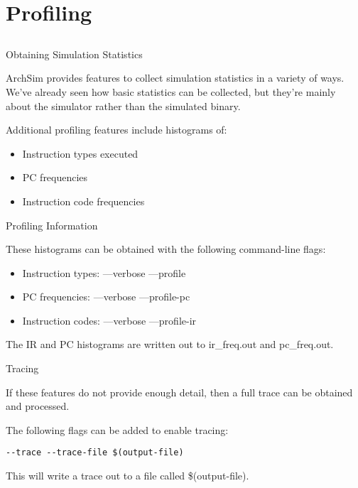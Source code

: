 \section{Profiling}
\subsection{}

\begin{frame}{Obtaining Simulation Statistics}

ArchSim provides features to collect simulation statistics in a variety
of ways. We've already seen how basic statistics can be collected, but
they're mainly about the simulator rather than the simulated binary.

Additional profiling features include histograms of:
\begin{itemize}
\item Instruction types executed
\item PC frequencies
\item Instruction code frequencies
\end{itemize}

\end{frame}

\begin{frame}{Profiling Information}

These histograms can be obtained with the following command-line flags:

\begin{itemize}
\item Instruction types: {\ttfamily ---verbose ---profile}
\item PC frequencies: {\ttfamily ---verbose ---profile-pc}
\item Instruction codes: {\ttfamily ---verbose ---profile-ir}
\end{itemize}

The IR and PC histograms are written out to ir\_freq.out and pc\_freq.out.

\end{frame}

\begin{frame}[fragile]{Tracing}

If these features do not provide enough detail, then a full trace can
be obtained and processed.

The following flags can be added to enable tracing:

\begin{lstlisting}
--trace --trace-file $(output-file)
\end{lstlisting}

This will write a trace out to a file called \$(output-file).

\end{frame}

